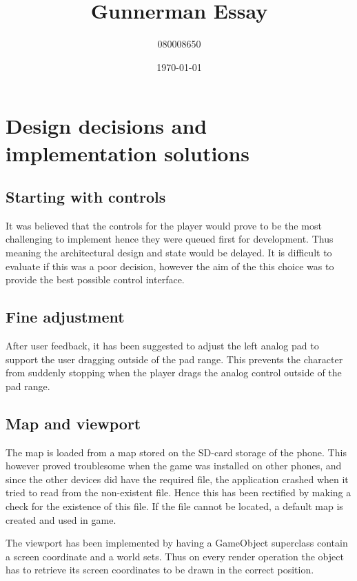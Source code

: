 \documentclass[11pt]{article} %
\title{Gunnerman Essay}
\author{080008650}
\date{\today} %
\begin{document}
\maketitle

\section{Design decisions and implementation solutions}

\subsection{Starting with controls}

It was believed that the controls for the player would prove to be the most challenging to implement hence they were queued first for development. Thus meaning the architectural design and state would be delayed. It is difficult to evaluate if this was a poor decision, however the aim of the this choice was to provide the best possible control interface.

\subsection{Fine adjustment}

After user feedback, it has been suggested to adjust the left analog pad to support the user dragging outside of the pad range. This prevents the character from suddenly stopping when the player drags the analog control outside of the pad range.

\subsection{Map and viewport}

The map is loaded from a map stored on the SD-card storage of the phone. This however proved troublesome when the game was installed on other phones, and since the other devices did have the required file, the application crashed when it tried to read from the non-existent file. Hence this has been rectified by making a check for the existence of this file. If the file cannot be located, a default map is created and used in game.

The viewport has been implemented by having a GameObject superclass contain a screen coordinate and a world sets. Thus on every render operation the object has to retrieve its screen coordinates to be drawn in the correct position.
\end{document}
